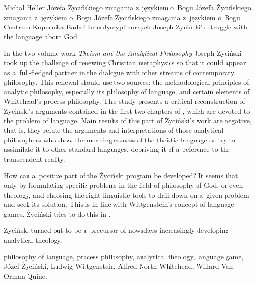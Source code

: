 \begin{artplenv}{Michał Heller}
	{Józefa Życińskiego zmagania z~językiem o~Bogu}
	{Józefa Życińskiego zmagania z~językiem o~Bogu}
	{Józefa Życińskiego zmagania z~językiem o~Bogu}
	{Centrum Kopernika Badań Interdyscyplinarnych}
	{Joseph Życiński's struggle with the language about God}
	{In the two-volume work \textit{Theism and the Analytical Philosophy} \parencites*{zycinski_teizm_1985}{zycinski_teizm_1988} Joseph Życiński took up the challenge of renewing Christian metaphysics so that it could appear as a~full-fledged partner in the dialogue with other streams of contemporary philosophy. This renewal should use two sources: the methodological principles of analytic philosophy, especially its philosophy of language, and certain elements of Whitehead's process philosophy. This study presents a~critical reconstruction of Życiński's arguments contained in the first two chapters of \parencite*[][]{zycinski_teizm_1985}, which are devoted to the problem of language. Main results of this part of Życiński's work are negative, that is, they refute the arguments and interpretations of those analytical philosophers who show the meaninglessness of the theistic language or try to assimilate it to other standard languages, depriving it of a~reference to the transcendent reality.
	
	How can a~positive part of the Życiński program be developed? It seems that only by formulating specific problems in the field of philosophy of God, or even theology, and choosing the right linguistic tools to drill down on a~given problem and seek its solution. This is in line with Wittgenstein's concept of language games. Życiński tries to do this in \parencite*[][]{zycinski_teizm_1988}.
	
	Życiński turned out to be a~precursor of nowadays increasingly developing analytical theology.}
	{philosophy of language, process philosophy, analytical theology, language game, Józef Życiński, Ludwig Wittgenstein, Alfred North Whitehead, Willard Van Orman Quine.}




\end{artplenv}
